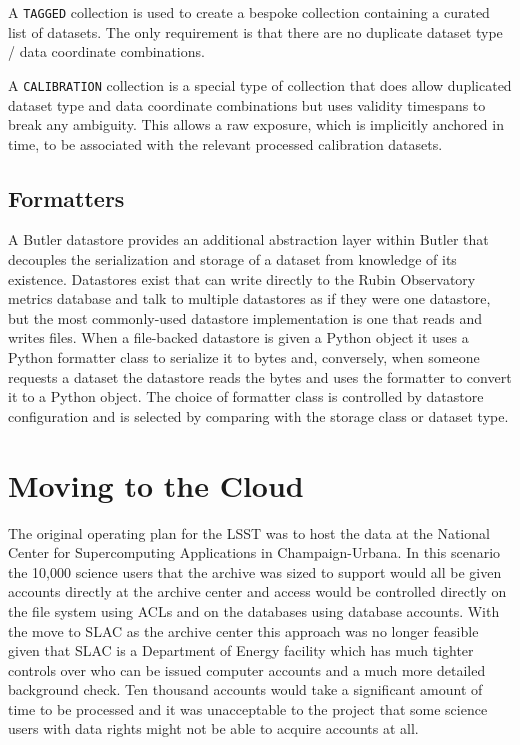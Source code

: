 A \texttt{TAGGED} collection is used to create a bespoke collection containing a curated list of datasets.
The only requirement is that there are no duplicate dataset type / data coordinate combinations.

A \texttt{CALIBRATION} collection is a special type of collection that does allow duplicated dataset type and data coordinate combinations but uses validity timespans to break any ambiguity.
This allows a raw exposure, which is implicitly anchored in time, to be associated with the relevant processed calibration datasets.

\subsection{Formatters}

A Butler datastore provides an additional abstraction layer within Butler that decouples the serialization and storage of a dataset from knowledge of its existence.
Datastores exist that can write directly to the Rubin Observatory metrics database \cite{2024SPIE13101.59Ftmp} and talk to multiple datastores as if they were one datastore, but the most commonly-used datastore implementation is one that reads and writes files.
When a file-backed datastore is given a Python object it uses a Python formatter class to serialize it to bytes and, conversely, when someone requests a dataset the datastore reads the bytes and uses the formatter to convert it to a Python object.
The choice of formatter class is controlled by datastore configuration and is selected by comparing with the storage class or dataset type.

\section{Moving to the Cloud}

The original operating plan for the LSST was to host the data at the National Center for Supercomputing Applications in Champaign-Urbana. \cite{2012SPIE.8451E..0VF}
In this scenario the 10,000 science users that the archive was sized to support would all be given accounts directly at the archive center and access would be controlled directly on the file system using ACLs and on the databases using database accounts.
With the move to SLAC as the archive center \cite{RTN-021} this approach was no longer feasible given that SLAC is a Department of Energy facility which has much tighter controls over who can be issued computer accounts and a much more detailed background check.
Ten thousand accounts would take a significant amount of time to be processed and it was unacceptable to the project that some science users with data rights might not be able to acquire accounts at all.

